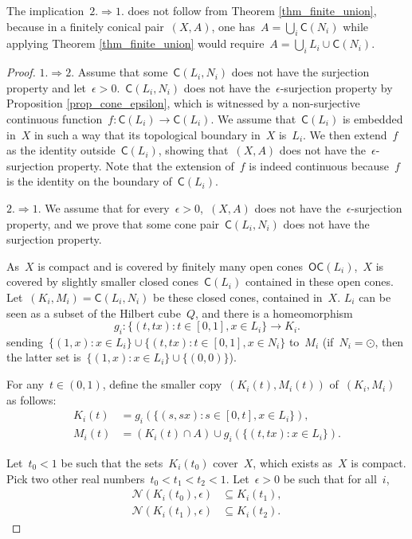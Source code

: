 \documentclass[english,11pt]{article}
\theoremstyle{plain}
\theoremstyle{remark}
\theoremstyle{definition}
\newcommand{\Ne}{\mathcal{N}}
\newcommand{\unit}{\odot}%
\newcommand{\C}[1]{\mathsf{C}(#1)}%
\newcommand{\OC}[1]{\mathsf{OC}(#1)}%
\begin{document}
The implication~$2.\Rightarrow 1.$ does not follow from Theorem \ref{thm_finite_union}, because in  a finitely conical pair~$(X,A)$, one has~$A=\bigcup_i\C{N_i}$ while  applying Theorem \ref{thm_finite_union} would require~$A=\bigcup_iL_i\cup\C{N_i}$.

\begin{proof}
$1.\Rightarrow 2.$ Assume that some~$\C{L_i,N_i}$ does not have the surjection property and let~$\epsilon>0$.~$\C{L_i,N_i}$ does not have the~$\epsilon$-surjection property by Proposition \ref{prop_cone_epsilon}, which is witnessed by a non-surjective continuous function~$f:\C{L_i}\to\C{L_i}$. We assume that~$\C{L_i}$ is embedded in~$X$ in such a way that its topological boundary in~$X$ is~$L_i$. We then extend~$f$ as the identity outside~$\C{L_i}$, showing that~$(X,A)$ does not have the~$\epsilon$-surjection property. Note that the extension of~$f$ is indeed continuous because~$f$ is the identity on the boundary of~$\C{L_i}$.

$2.\Rightarrow1.$ We assume that for every~$\epsilon>0$,~$(X,A)$ does not have the~$\epsilon$-surjection property, and we prove that some cone pair~$\C{L_i,N_i}$ does not have the surjection property.

As~$X$ is compact and is covered by finitely many open cones~$\OC{L_i}$,~$X$ is covered by slightly smaller closed cones~$\C{L_i}$ contained in these open cones. Let~$(K_i,M_i)=\C{L_{i},N_{i}}$ be these closed cones, contained in~$X$. $L_{i}$ can be seen as a subset of the Hilbert cube~$Q$, and there is a homeomorphism
\[
g_i:\{(t,t x):t\in[0,1],x\in L_{i}\}\to K_i.
\]
sending~$\{(1,x):x\in L_i\}\cup\{(t,tx):t\in [0,1],x\in N_i\}$ to~$M_i$ (if~$N_i=\unit$, then the latter set is~$\{(1,x):x\in L_i\}\cup\{(0,0)\}$).

For any~$t\in(0,1)$, define the smaller copy~$(K_i(t),M_i(t))$ of~$(K_i,M_i)$ as follows:
\begin{align*}
K_i(t) & =g_i(\{(s,sx):s\in[0,t],x\in L_{i}\}),\\
M_i(t) & =(K_i(t)\cap A)\cup g_i(\{(t,t x):x\in L_{i}\}).
\end{align*}

Let~$t_0<1$ be such that the sets~$K_i(t_0)$ cover~$X$, which exists  as~$X$ is compact. Pick two other real numbers~$t_0<t_1<t_2<1$. Let~$\epsilon>0$ be such that for all~$i$,%
\begin{align}
\Ne(K_i(t_{0}),\epsilon) & \subseteq K_i(t_{1}),\label{eq1K}\\
\Ne(K_i(t_{1}),\epsilon) & \subseteq K_i(t_{2}).\label{eq2K}
\end{align}


\end{proof}
\end{document}
